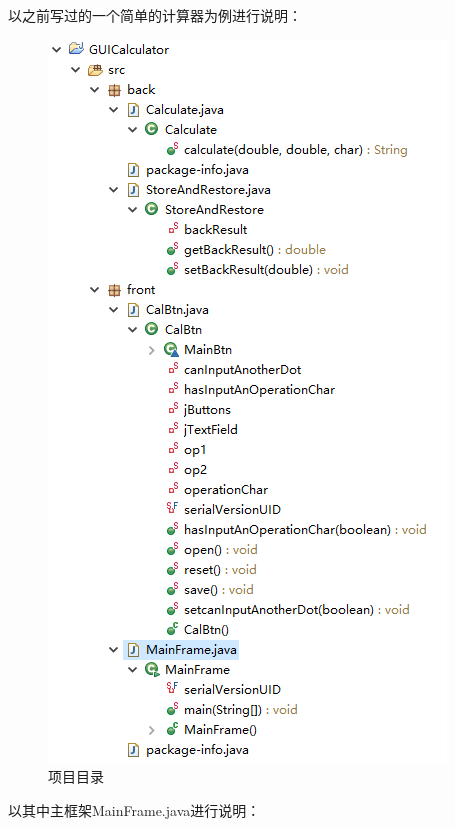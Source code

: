 以之前写过的一个简单的计算器为例进行说明：
\begin{figure}[H]
	\centering
	\includegraphics[height=0.9\textheight]{3.png}
	\caption{项目目录}
\end{figure}
以其中主框架MainFrame.java进行说明：

